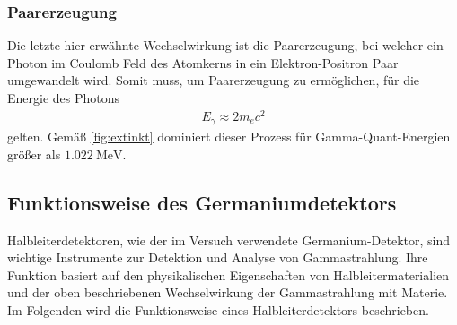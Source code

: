 \subsubsection{Paarerzeugung}
Die letzte hier erwähnte Wechselwirkung ist die Paarerzeugung, bei welcher ein Photon im Coulomb Feld des Atomkerns in ein Elektron-Positron Paar umgewandelt wird.
Somit muss, um Paarerzeugung zu ermöglichen, für die Energie des Photons
\begin{align}
  E_\gamma \approx 2m_ec^2
\end{align}
gelten. Gemäß \autoref{fig:extinkt} dominiert dieser Prozess für Gamma-Quant-Energien größer als $\SI{1.022}{\mega\eV}$.
\subsection{Funktionsweise des Germaniumdetektors}
Halbleiterdetektoren, wie der im Versuch verwendete Germanium-Detektor, sind wichtige Instrumente zur Detektion und Analyse von Gammastrahlung. Ihre Funktion basiert auf den physikalischen Eigenschaften von Halbleitermaterialien und der oben beschriebenen Wechselwirkung der Gammastrahlung mit Materie. Im Folgenden wird die Funktionsweise eines Halbleiterdetektors beschrieben.

